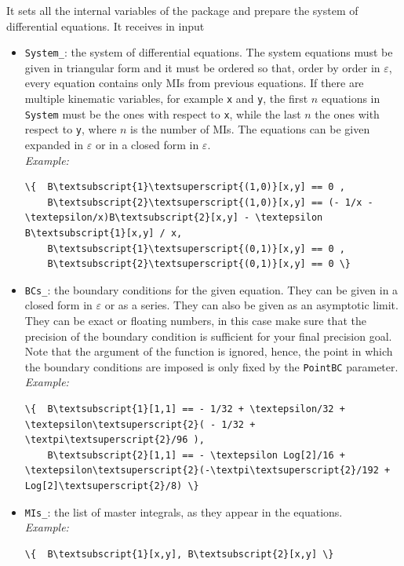 \documentclass[final,1p,times]{elsarticle}
\begin{document}
\begin{itemize}
    It sets all the internal variables of the package and prepare the system of differential equations. It receives in input
    \begin{itemize}
        \item \texttt{System\_}: the system of differential equations. The system equations must be given in triangular form and it must be ordered so that, order by order in $\varepsilon$, every equation contains only MIs from previous equations. If there are multiple kinematic variables, for example \texttt{x} and \texttt{y}, the first $n$ equations in \texttt{System} must be the ones with respect to \texttt{x}, while the last $n$ the ones with respect to \texttt{y}, where $n$ is the number of MIs. The equations can be given expanded in $\varepsilon$ or in a closed form in $\varepsilon$.\\
        \textit{Example:}
\begin{Verbatim}[commandchars=\\\{\}]
\{  B\textsubscript{1}\textsuperscript{(1,0)}[x,y] == 0 ,
    B\textsubscript{2}\textsuperscript{(1,0)}[x,y] == (- 1/x - \textepsilon/x)B\textsubscript{2}[x,y] - \textepsilon B\textsubscript{1}[x,y] / x,
    B\textsubscript{1}\textsuperscript{(0,1)}[x,y] == 0 ,
    B\textsubscript{2}\textsuperscript{(0,1)}[x,y] == 0 \}
\end{Verbatim}
\item \texttt{BCs\_}: the boundary conditions for the given equation. They can be given in a closed form in $\varepsilon$ or as a series. They can also be given as an asymptotic limit. They can be exact or floating numbers, in this case make sure that the precision of the boundary condition is sufficient for your final precision goal. Note that the argument of the function is ignored, hence, the point in which the boundary conditions are imposed is only fixed by the \texttt{PointBC} parameter.
        \\
        \textit{Example:}
\begin{Verbatim}[commandchars=\\\{\}]
\{  B\textsubscript{1}[1,1] == - 1/32 + \textepsilon/32 + \textepsilon\textsuperscript{2}( - 1/32 + \textpi\textsuperscript{2}/96 ),
    B\textsubscript{2}[1,1] == - \textepsilon Log[2]/16 + \textepsilon\textsuperscript{2}(-\textpi\textsuperscript{2}/192 + Log[2]\textsuperscript{2}/8) \}
\end{Verbatim}
        
        \item \texttt{MIs\_}: the list of master integrals, as they appear in the equations.\\
        \textit{Example:}
\begin{Verbatim}[commandchars=\\\{\}]
\{  B\textsubscript{1}[x,y], B\textsubscript{2}[x,y] \} 
\end{Verbatim}
        

\end{itemize}
\end{itemize}
\end{document}
